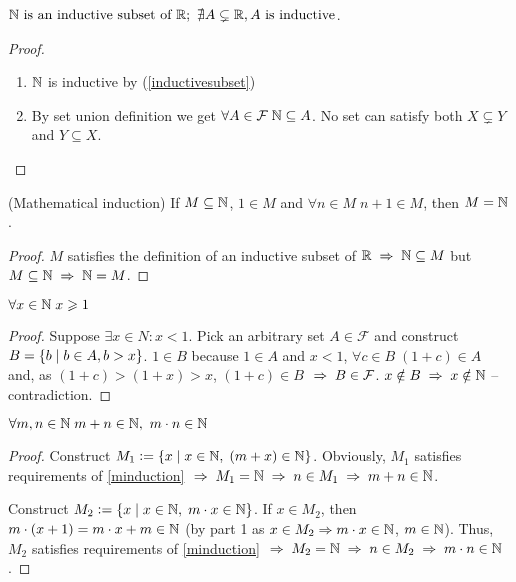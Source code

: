 \begin{theorem}
    $ \mathbb{N}\text{ is an inductive subset of } \mathbb{R};\ \nexists A \subsetneq \mathbb{R}, A \text{ is inductive}$.
\end{theorem}
\begin{proof}\phantom\\
    \begin{enumerate}
        \item $\mathbb{N}$ is inductive by (\ref{inductivesubset})
        \item By set union definition we get $\forall A \in \mathcal{F} \; \mathbb{N} \subseteq A$. No set can satisfy both $X \subsetneq Y$ and $Y \subseteq X$.
    \end{enumerate}
\end{proof}

\begin{theorem} (Mathematical induction)
    If $M \subseteq \mathbb{N}$, $1 \in M$ and $\forall n \in M \; n + 1 \in M$, then $M = \mathbb{N}$.
    \label{minduction}
\end{theorem}
\begin{proof}
    $M$ satisfies the definition of an inductive subset of $\mathbb{R} \;\Rightarrow\; \mathbb{N} \subseteq M$ but ${M \subseteq \mathbb{N}} \;\Rightarrow\; {\mathbb{N} = M}$.
\end{proof}

\begin{theorem}
    $ \forall x \in \mathbb{N} \; x \geqslant 1 $
\end{theorem}
\begin{proof}
    Suppose $\exists x \in N : x < 1$. Pick an arbitrary set $A \in \mathcal{F}$ and construct $B = \{b \;\vert\; b \in A, b > x\}$. $1 \in B$ because $1 \in A$ and $x < 1$, $\forall c \in B \; (1 + c) \in A$ and, as $(1 + c) > (1 + x) > x$, $(1 + c) \in B$ $\;\Rightarrow\; B \in \mathcal{F}$. $x \notin B \;\Rightarrow\; x \notin \mathbb{N}$ -- contradiction.
\end{proof}

\begin{theorem}
    $ \forall m, n \in \mathbb{N} \; m + n \in \mathbb{N},\ m \cdot n \in \mathbb{N}$
\end{theorem}
\begin{proof}
    Construct $M_1 \vcentcolon= \{x \;\vert\; x \in \mathbb{N},\; (m + x) \in \mathbb{N}\}$. Obviously, $M_1$ satisfies requirements of \ref{minduction} $\;\Rightarrow\; M_1 = \mathbb{N} \;\Rightarrow\; n \in M_1 \;\Rightarrow\; m + n \in \mathbb{N}$.

    Construct $M_2 \vcentcolon= \{x \;\vert\; x \in \mathbb{N},\; m \cdot x \in \mathbb{N}\}$. If $x \in M_2$, then $m \cdot (x + 1) = m \cdot x + m \in \mathbb{N}$ (by part 1 as $x \in M_2 \Rightarrow m \cdot x \in \mathbb{N}$, $m \in \mathbb{N}$). Thus, $M_2$ satisfies requirements of \ref{minduction} $\;\Rightarrow\; M_2 = \mathbb{N} \;\Rightarrow\; n \in M_2 \;\Rightarrow\; m \cdot n \in \mathbb{N}$.
\end{proof}